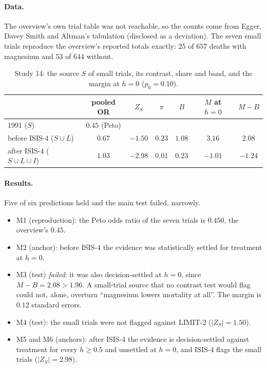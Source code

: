 \paragraph{Data.} The overview's own trial table was not reachable, so the counts come from Egger, Davey Smith and Altman's tabulation
\cite{EggerSmithAltman2001} (disclosed as a deviation). The seven small trials reproduce the overview's reported totals exactly: $25$ of
$657$ deaths with magnesium and $53$ of $644$ without.

\begin{table}[!htbp]\centering\small
\begin{tabular}{lcccccc}\toprule
 & pooled OR & $Z_S$ & $\pi$ & $B$ & $M$ at $h=0$ & $M-B$\\\midrule
1991 ($S$) & $0.45$ (Peto) & & & & & \\
before ISIS-4 ($S\cup L$) & $0.67$ & $-1.50$ & $0.23$ & $1.08$ & $3.16$ & $2.08$\\
after ISIS-4 ($S\cup L\cup I$) & $1.03$ & $-2.98$ & $0.01$ & $0.23$ & $-1.01$ & $-1.24$\\\bottomrule
\end{tabular}
\caption{Study 14: the source $S$ of small trials, its contrast, share and band, and the margin at $h=0$ ($p_0=0.10$).}\label{tab:study14}
\end{table}

\paragraph{Results.} Five of six predictions held and the main test failed, narrowly.
\begin{itemize}
\item M1 (reproduction): the Peto odds ratio of the seven trials is $0.450$, the overview's $0.45$.
\item M2 (anchor): before ISIS-4 the evidence was statistically settled for treatment at $h=0$.
\item M3 (test) \emph{failed}: it was also decision-settled at $h=0$, since $M-B=2.08>1.96$. A small-trial source that no contrast
  test would flag could not, alone, overturn ``magnesium lowers mortality at all''. The margin is $0.12$ standard errors.
\item M4 (test): the small trials were not flagged against LIMIT-2 ($|Z_S|=1.50$).
\item M5 and M6 (anchors): after ISIS-4 the evidence is decision-settled against treatment for every $h\ge0.5$ and unsettled at $h=0$,
  and ISIS-4 flags the small trials ($|Z_S|=2.98$).
\end{itemize}

